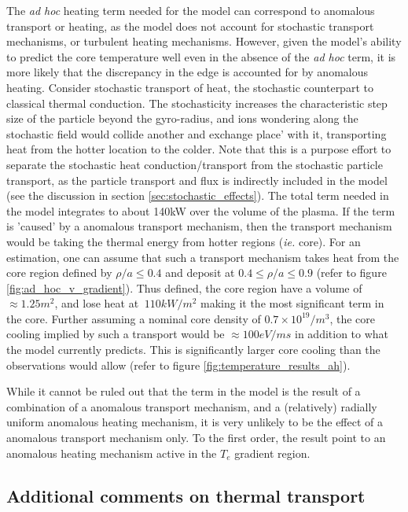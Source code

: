 The \textit{ad hoc} heating term needed for the model can correspond to anomalous transport or heating, as the model does not account for stochastic transport mechanisms, or turbulent heating mechanisms. However, given the model's ability to predict the core temperature well even in the absence of the \textit{ad hoc} term, it is more likely that the discrepancy in the edge is accounted for by anomalous heating. 
Consider stochastic transport of heat, the stochastic counterpart to classical thermal conduction. The stochasticity increases the characteristic step size of the particle beyond the gyro-radius, and ions wondering along the stochastic field would collide another and exchange place' with it, transporting heat from the hotter location to the colder. Note that this is a purpose effort to separate the stochastic heat conduction/transport from the stochastic particle transport, as the particle transport and flux is indirectly included in the model (see the discussion in section \ref{sec:stochastic_effects}). The total \adhoc term needed in the model integrates to about 140kW over the volume of the plasma. If the \adhoc term is 'caused' by a anomalous transport mechanism, then the transport mechanism would be taking the thermal energy from hotter regions (\textit{ie.} core). For an estimation, one can assume that such a transport mechanism takes heat from the core region defined by $\rho/a \leq 0.4$ and deposit at $0.4 \leq \rho/a \leq 0.9$ (refer to figure \ref{fig:ad_hoc_v_gradient}). Thus defined, the core region have a volume of $\approx 1.25 m^2$, and lose heat at $~110kW/m^2$ making it the most significant term in the core. Further assuming a nominal core density of $0.7 \times 10^{19}/m^3$, the core cooling implied by such a transport would be $\approx 100eV/ms$ in addition to what the model currently predicts. This is significantly larger core cooling than the observations would allow (refer to figure \ref{fig:temperature_results_ah}).

While it cannot be ruled out that the \adhoc term in the model is the result of a combination of a anomalous transport mechanism, and a (relatively) radially uniform anomalous heating mechanism, it is very unlikely to be the effect of a anomalous transport mechanism only. To the first order, the result point to an anomalous heating mechanism active in the $T_e$ gradient region.

\subsection{Additional comments on thermal transport}


